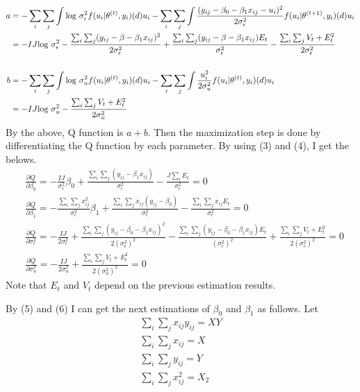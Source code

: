\documentclass{article}
\begin{document}
		\begin{align}
			a &= -\sum_i \sum_j \int {\rm log}\ \sigma_\epsilon^2 f(u_i | \theta^{(t)}, y_i) \mathrm(d) u_i - \sum_i \sum_j \int \frac{(y_{ij} - \beta_0 -\beta_1 x_{ij} - u_i)^2}{2\sigma_\epsilon^2} f(u_i | \theta^{(t+1)}, y_i) \mathrm(d)u_i \nonumber \\
			&= -IJ{\rm log}\ \sigma_\epsilon^2 -\frac{\sum_i \sum_j (y_{ij} - \beta - \beta_1 x_{ij})^2}{2\sigma_\epsilon^2} + \frac{\sum_i \sum_j (y_{ij} - \beta - \beta_1 x_{ij}) E_t}{\sigma_\epsilon^2} - \frac{\sum_i \sum_j V_t + E_t^2}{2\sigma_\epsilon^2}\\[15pt]
			b &= -\sum_i \sum_j \int {\rm log}\ \sigma_u^2 f(u_i | \theta^{(t)}, y_i) \mathrm(d)u_i  - \sum_i \sum_j \int \frac{u_i^2}{2\sigma_u^2} f(u_i | \theta^{(t)}, y_i) \mathrm(d)u_i \nonumber \\
			&= -IJ {\rm log}\ \sigma_u^2 -\frac{\sum_i \sum_j V_t + E_t^2}{2\sigma_u^2}
		\end{align}
		By the above, Q function is $a + b$. Then the maximization step is done by differentiating the Q function by each parameter. By using (3) and (4), I get the belows.
		\begin{align}
			&\frac{\partial Q}{\partial \beta_0} = -\frac{IJ}{\sigma_\epsilon^2}\beta_0 + \frac{\sum_i \sum_j (y_{ij} - \beta_1 x_{ij})}{\sigma_\epsilon^2} - \frac{J\sum_i E_t}{\sigma_\epsilon^2} = 0\\[10pt]
			&\frac{\partial Q}{\partial \beta_1} = -\frac{\sum_i \sum_j x_{ij}^2}{\sigma_\epsilon^2}\beta_1 + \frac{\sum_i \sum_j x_{ij} (y_{ij} - \beta_0)}{\sigma_\epsilon^2} - \frac{\sum_i \sum_j x_{ij} E_t}{\sigma_\epsilon^2} = 0\\[10pt]
			&\frac{\partial Q}{\partial \sigma_\epsilon^2} = -\frac{IJ}{2\sigma_\epsilon^2} + \frac{\sum_i \sum_j (y_{ij} - \beta_0 -\beta_1 x_{ij})^2}{2(\sigma_\epsilon^2)^2} - \frac{\sum_i \sum_j (y_{ij} - \beta_0 -\beta_1 x_{ij}) E_t}{(\sigma_\epsilon^2)^2} + \frac{\sum_i \sum_j V_t + E_t^2}{2(\sigma_\epsilon^2)^2} = 0\\[10pt]
			&\frac{\partial Q}{\partial \sigma_u^2} = -\frac{IJ}{2\sigma_u^2} + \frac{\sum_i \sum_j V_t + E_t^2}{2(\sigma_u^2)^2} = 0
		\end{align}
		Note that $E_t$ and $V_t$ depend on the previous estimation results.\par
		By (5) and (6) I can get the next estimations of $\beta_0$ and $\beta_1$ as follows. Let
		\begin{align*}
			\sum_i \sum_j x_{ij} y_{ij} = XY\\
			\sum_i \sum_j x_{ij} = X\\
			\sum_i \sum_j y_{ij} = Y\\
			\sum_i \sum_j x_{ij}^2 = X_2
		\end{align*}
\end{document}
